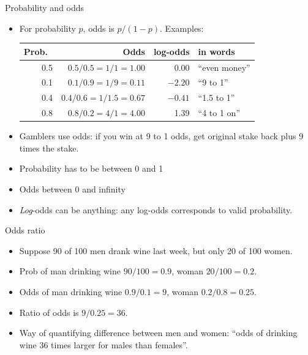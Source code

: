 \documentclass[unknownkeysallowed]{beamer}\usepackage[]{graphicx}\usepackage[]{color}
\begin{document}
\begin{frame}[fragile]{Probability and odds}
  
  \begin{itemize}
  \item For probability $p$, odds is $p/(1-p)$. Examples:
    \vfill
    \begin{tabular}{rrrl}
      \hline
      Prob.\ & Odds & log-odds & in words\\
      \hline
      0.5 & $0.5/0.5=1/1=1.00$ & 0.00 &  ``even money''\\
      0.1 & $0.1/0.9=1/9=0.11$ & $-2.20$ & ``9 to 1''\\
      0.4 & $0.4/0.6=1/1.5=0.67$ & $-0.41$ & ``1.5 to 1''\\
      0.8 & $0.8/0.2=4/1=4.00$ & 1.39 & ``4 to 1 on''\\
      \hline
    \end{tabular}
    \vfill
  \item Gamblers use odds: if you win at 9 to 1 odds, get original
    stake back plus 9 times the stake.
  \item Probability has to be between 0 and 1
  \item Odds between 0 and infinity
  \item \emph{Log}-odds can be anything: any log-odds corresponds to
    valid probability.
  \end{itemize}
  
\end{frame}

\begin{frame}[fragile]{Odds ratio}
  
  \begin{itemize}
  \item Suppose 90 of 100 men drank wine last week, but only 20 of 100 women.
  \item Prob of man drinking wine $90/100=0.9$, woman $20/100=0.2$.
  \item Odds of man drinking wine $0.9/0.1=9$, woman $0.2/0.8=0.25$.
  \item Ratio of odds is $9/0.25=36$.
  \item Way of quantifying difference between men and women: ``odds of
    drinking wine 36 times larger for males than females''. 
  \end{itemize}
  
\end{frame}
\end{document}
